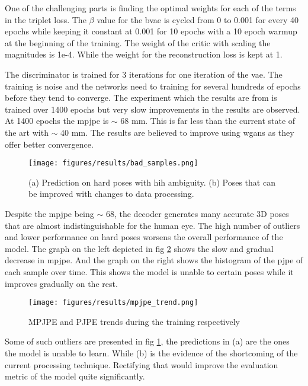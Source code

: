 One of the challenging parts is finding the optimal weights for each of the terms in the triplet loss. The $\beta$ value for the \ac{bvae} is cycled from 0 to 0.001 for every 40 epochs while keeping it constant at 0.001 for 10 epochs with a 10 epoch warmup at the beginning of the training. The weight of the critic with scaling the magnitudes is 1e-4. While the weight for the reconstruction loss is kept at 1. 

The discriminator is trained for 3 iterations for one iteration of the \ac{vae}. The training is noise and the networks need to training for several hundreds of epochs before they tend to converge. The experiment which the results are from is trained over 1400 epochs but very slow improvements in the results are observed. At 1400 epochs the \ac{mpjpe} is $\sim$ 68 mm. This is far less than the current state of the art \cite{amazon1} with $\sim$ 40 mm. The results are believed to improve using \acp{wgan} as they offer better convergence. 

\begin{figure}[!h]
    \centering
    \texttt{[image: figures/results/bad\_samples.png]}
    \caption{(a) Prediction on hard poses with hih ambiguity. (b) Poses that can be improved with changes to data processing.}
    \label{fig:bad_samples}
\end{figure}

Despite the \ac{mpjpe} being $\sim$ 68, the decoder generates many accurate 3D poses that are almost indistinguishable for the human eye. The high number of outliers and lower performance on hard poses worsens the overall performance of the model. The graph on the left depicted in fig \ref{fig:mpjpe_trends} shows the slow and gradual decrease in \ac{mpjpe}. And the graph on the right shows the histogram of the \ac{pjpe} of each sample over time. This shows the model is unable to certain poses while it improves gradually on the rest. 

\begin{figure}[!h]
    \centering
    \texttt{[image: figures/results/mpjpe\_trend.png]}
    \caption{MPJPE and PJPE trends during the training respectively}
    \label{fig:mpjpe_trends}
\end{figure}

Some of such outliers are presented in fig \ref{fig:bad_samples}, the predictions in (a) are the ones the model is unable to learn. While (b) is the evidence of the shortcoming of the current processing technique. Rectifying that would improve the evaluation metric of the model quite significantly.



